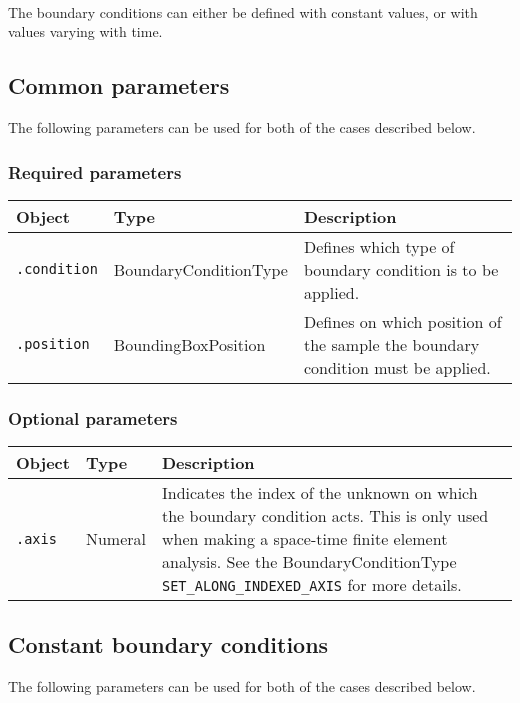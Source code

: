 \documentclass[10pt]{article}
\begin{document}
\paragraph{} The boundary conditions can either be defined with constant values, or with values varying with time.

\subsection{Common parameters}

The following parameters can be used for both of the cases described below.

\subsubsection*{Required parameters}

\begin{tabularx}{\textwidth}{llX}
\hline 
Object & Type & Description \\ 
\hline 
\verb+.condition+ & BoundaryConditionType & Defines which type of boundary condition is to be applied. \\ 
\verb+.position+ & BoundingBoxPosition & Defines on which position of the sample the boundary condition must be applied.\\ 
\hline 
\end{tabularx}

\subsubsection*{Optional parameters}

\begin{tabularx}{\textwidth}{llX}
\hline 
Object & Type & Description \\ 
\hline 
\verb+.axis+ & Numeral & Indicates the index of the unknown on which the boundary condition acts. This is only used when making a space-time finite element analysis. See the BoundaryConditionType \verb+SET_ALONG_INDEXED_AXIS+ for more details.\\ 
\hline 
\end{tabularx}

\subsection{Constant boundary conditions}

The following parameters can be used for both of the cases described below.
\end{document}
